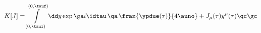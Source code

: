 \begin{equation}
 K[J]=\int\limits_{(0,\taui)}^{(0,\tauf)}\dd y \exp\ga
i\idtau\,\qa\,\fraz{\ypdue(\tau)}{4\auno}+J_\mu(\tau)y^\mu(\tau)\qc
\gc \label{KJ}
\end{equation}

